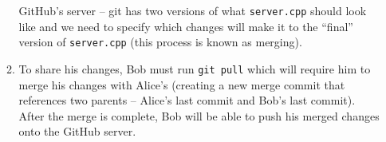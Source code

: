 \documentclass{report}
\begin{document}
\begin{problem}
\begin{answer}{37em}
\begin{enumerate}
\begin{enumerate}
            GitHub's server -- git has two versions of what
            \texttt{server.cpp} should look like and we need to specify which
            changes will make it to the ``final'' version of
            \texttt{server.cpp} (this process is known as merging).
      \item To share his changes, Bob must run \texttt{git pull} which will
            require him to merge his changes with Alice's (creating a new
            merge commit that references two parents -- Alice's last commit
            and Bob's last commit). After the merge is complete, Bob will be
            able to push his merged changes onto the GitHub server.
    \end{enumerate}
  \end{enumerate}
\end{answer}

\end{problem}
\end{document}
